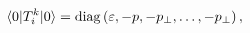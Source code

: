 \begin{equation}
\langle 0|T_{i}^{k}|0\rangle ={\rm diag}\left( \varepsilon ,-p,-p_{\perp
},\ldots ,-p_{\perp }\right) ,  \label{diagEMT}
\end{equation}

